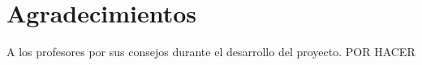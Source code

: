 %
%
\chapter*{Agradecimientos}
\vspace*{2cm}

A los profesores {\director} por sus consejos durante el desarrollo del proyecto.  POR HACER\\


